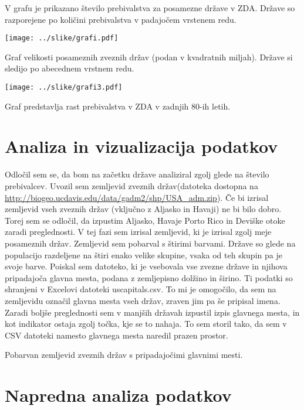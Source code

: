 \documentclass[11pt,a4paper]{article}
\begin{document}
V grafu je prikazano število prebivalstva za posamezne države v ZDA. Države so razporejene po količini prebivalstva v padajočem vrstenem redu.

\texttt{[image: ../slike/grafi.pdf]}

Graf velikosti posameznih zveznih držav (podan v kvadratnih miljah). Države si sledijo po abecednem vrstnem redu.

\texttt{[image: ../slike/grafi3.pdf]}

Graf predstavlja rast prebivalstva v ZDA v zadnjih 80-ih letih.

\pagebreak

\section{Analiza in vizualizacija podatkov}

Odločil sem se, da bom na začetku države analiziral zgolj glede na število prebivalcev. Uvozil sem zemljevid zveznih držav(datoteka dostopna na \url{http://biogeo.ucdavis.edu/data/gadm2/shp/USA_adm.zip}). Če bi izrisal zemljevid vseh zveznih držav (vključno z Aljasko in Havaji) ne bi bilo dobro. Torej sem se odločil, da izpustim Aljasko, Havaje Porto Rico in Deviške otoke zaradi
preglednosti. V tej fazi sem izrisal zemljevid, ki je izrisal zgolj meje posameznih držav.
Zemljevid sem pobarval s štirimi barvami. Države so glede na populacijo razdeljene na štiri enako velike skupine, vsaka od teh skupin pa je svoje barve.
Poiskal sem datoteko, ki je vsebovala vse zvezne države in njihova pripadajoča glavna mesta, podana z zemljepisno dolžino in širino. Ti podatki so shranjeni v Excelovi datoteki uscapitals.csv. To mi je omogočilo, da sem na zemljevidu označil glavna mesta vseh držav, zraven jim pa še pripisal imena. Zaradi boljše preglednosti sem v manjših državah izpustil izpis glavnega mesta, in kot indikator ostaja zgolj točka, kje se to nahaja. To sem storil tako, da sem v CSV datoteki namesto glavnega mesta naredil prazen prostor.

Pobarvan zemljevid zveznih držav s pripadajočimi glavnimi mesti.

\newpage
\section{Napredna analiza podatkov}
\end{document}
